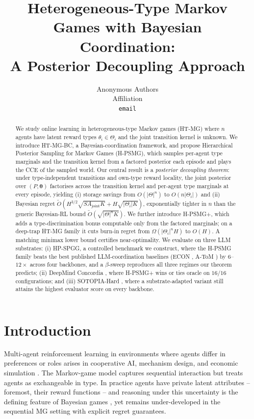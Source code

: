 ﻿\documentclass{article}
\title{Heterogeneous-Type Markov Games with Bayesian Coordination:\\
A Posterior Decoupling Approach}
\author{Anonymous Authors\\
Affiliation\\
\texttt{email}}
\def\textsuperscript#1{#1}%
\begin{document}
\maketitle

\begin{abstract}
We study online learning in heterogeneous-type Markov games (HT-MG) where $n$ agents have latent reward types $\theta_i \in \Theta_i$ and the joint transition kernel is unknown. We introduce HT-MG-BC, a Bayesian-coordination framework, and propose Hierarchical Posterior Sampling for Markov Games (H-PSMG), which samples per-agent type marginals and the transition kernel from a factored posterior each episode and plays the CCE of the sampled world. Our central result is a \emph{posterior decoupling theorem}: under type-independent transitions and own-type reward locality, the joint posterior over $(P, \boldsymbol{\theta})$ factorises across the transition kernel and per-agent type marginals at every episode, yielding (i) storage savings from $O(|\Theta|^n)$ to $O(n|\Theta_i|)$ and (ii) Bayesian regret $\tilde O(H^{3/2}\!\sqrt{SA_{\mathrm{joint}}K} + H\sqrt{|\Theta_i| K})$, exponentially tighter in $n$ than the generic Bayesian-RL bound $\tilde O(\sqrt{|\Theta|^n K})$. We further introduce H-PSMG\textsuperscript{+}, which adds a type-discrimination bonus computable only from the factored marginals; on a deep-trap HT-MG family it cuts burn-in regret from $\Omega(|\Theta_i|^n H)$ to $O(H)$. A matching minimax lower bound certifies near-optimality. We evaluate on three LLM substrates: (i) HP-SPGG, a controlled benchmark we construct, where the H-PSMG family beats the best published LLM-coordination baselines (ECON \citep{yang2025econ}, A-ToM \citep{xu2026atom}) by $6$--$12\times$ across four backbones, and a $\beta$-sweep reproduces all three regimes our theorem predicts; (ii) DeepMind Concordia \citep{vezhnevets2023concordia}, where H-PSMG\textsuperscript{+} wins or ties oracle on $16/16$ configurations; and (iii) SOTOPIA-Hard \citep{zhou2024sotopia}, where a substrate-adapted variant still attains the highest evaluator score on every backbone.
\end{abstract}


\section{Introduction}
\label{sec:intro}

Multi-agent reinforcement learning in environments where agents differ in preferences or roles arises in cooperative AI, mechanism design, and economic simulation \citep{zhang2021multi,leibo2017multi,perolat2017multi}. The Markov-game model \citep{shapley1953stochastic,littman1994markov} captures sequential interaction but treats agents as exchangeable in type. In practice agents have private latent attributes -- foremost, their reward functions -- and reasoning under this uncertainty is the defining feature of Bayesian games \citep{harsanyi1968games}, yet remains under-developed in the sequential MG setting with explicit regret guarantees.
\end{document}
